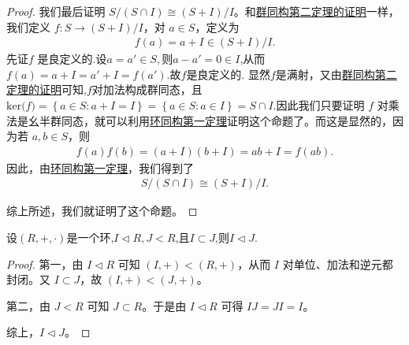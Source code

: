 \documentclass[../../main.tex]{subfiles}
\begin{document}
\begin{proof}
我们最后证明 $S / (S \cap I) \cong (S + I) / I$。和\hyperref[theorem:群同构第二定理]{群同构第二定理的证明}一样，我们定义 $f : S \to (S + I) / I$，对 $a \in S$，定义为
\begin{align*}
f(a) = a + I \in (S + I) / I.
\end{align*}
先证$f$ 是良定义的.设$a=a'\in S,$则$a-a'=0\in I$,从而$f(a)=a+I=a'+I=f(a')$.故$f$是良定义的.
显然$f$是满射，又由\hyperref[theorem:群同构第二定理]{群同构第二定理的证明}可知,$f$对加法构成群同态，且 $\mathrm{ker(}f)=\left\{ a\in S:a+I=I \right\} =\left\{ a\in S:a\in I \right\} =S\cap I.$因此我们只要证明 $f$ 对乘法是幺半群同态，就可以利用\hyperref[theorem:环同构第一定理]{环同构第一定理}证明这个命题了。而这是显然的，因为若 $a, b \in S$，则
\begin{align*}
f(a)f(b) = (a + I)(b + I) = ab + I = f(ab).
\end{align*}
因此，由\hyperref[theorem:环同构第一定理]{环同构第一定理}，我们得到了
\begin{align*}
S / (S \cap I) \cong (S + I) / I .
\end{align*}

综上所述，我们就证明了这个命题。
\end{proof}

\begin{lemma}\label{lemma:理想的"传递性"}
设$(R,+,\cdot)$是一个环,$I\lhd R,J<R$,且$I\subset J$,则$I\lhd J$.
\end{lemma}
\begin{proof}
第一，由 $I \triangleleft R$ 可知 $(I, +) < (R, +)$，从而 $I$ 对单位、加法和逆元都封闭。又 $I \subset J$，故 $(I, +) < (J, +)$。

第二，由 $J < R$ 可知 $J \subset R$。于是由 $I \triangleleft R$ 可得 $IJ = JI = I$。

综上，$I \triangleleft J$。 
\end{proof}
\end{document}
